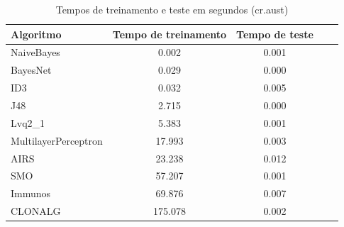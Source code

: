 \vspace{0.5cm}
\begin{table}[h!]
    \centering
    \caption{Tempos de treinamento e teste em segundos (cr.aust)}
    \label{tbl:dev_table_aust_times}
    \vspace{0.5cm}
    \begin{tabular}{|l|c|c|c|c|}
        \hline
        \textbf{Algoritmo} & \textbf{Tempo de treinamento} & \textbf{Tempo de teste} \\
        \hline
        \rowcolor[gray]{.9}
        NaiveBayes           &   0.002 & 0.001 \\ \hline
        \rowcolor[gray]{.9}
        BayesNet             &   0.029 & 0.000 \\ \hline
        \rowcolor[gray]{.9}
        ID3                  &   0.032 & 0.005 \\ \hline
        J48                  &   2.715 & 0.000 \\ \hline
        Lvq2\_1              &   5.383 & 0.001 \\ \hline
        MultilayerPerceptron &  17.993 & 0.003 \\ \hline
        AIRS                 &  23.238 & 0.012 \\ \hline
        SMO                  &  57.207 & 0.001 \\ \hline
        Immunos              &  69.876 & 0.007 \\ \hline
        CLONALG              & 175.078 & 0.002 \\ \hline
    \end{tabular}
\end{table}
\vspace{0.5cm}

